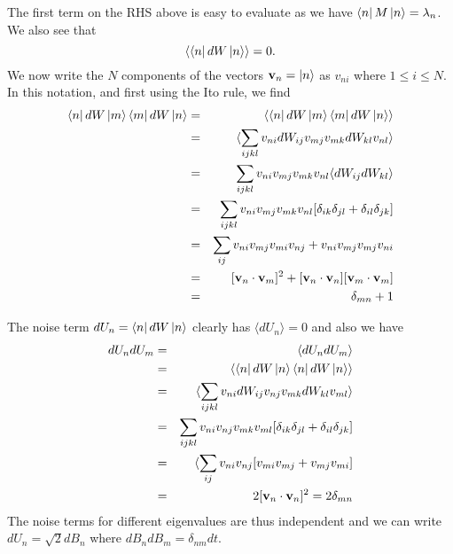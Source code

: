 \documentclass[11pt]{report}
\begin{document}
The first term on the RHS above is easy to evaluate as we have $\bra{n}M\ket{n}= \lambda_n$. We also see that
\begin{equation}
\langle \bra{n}dW\ket{n}\rangle=0.
\end{equation}
We now write the $N$ components of the vectors ${\bf v}_n=\ket{n}$ as $v_{ni}$ where $1\leq i\leq N$. In this notation, and first using the Ito rule, we find 
\begin{eqnarray}
\bra{n} dW\ket{m}\bra{m} dW\ket{n}&=&\langle \bra{n} dW\ket{m}\bra{m} dW\ket{n}\rangle \\
&=& \langle \sum_{ijkl} v_{ni}dW_{ij} v_{mj}v_{mk} dW_{kl}v_{nl}\rangle \\
&=&\sum_{ijkl} v_{ni} v_{mj}v_{mk} v_{nl}\langle dW_{ij}dW_{kl}\rangle\\
&=& \sum_{ijkl} v_{ni} v_{mj}v_{mk} v_{nl}[\delta_{ik}\delta_{jl}+\delta_{il}\delta_{jk}] \\
&=& \sum_{ij}v_{ni} v_{mj}v_{mi} v_{nj} + v_{ni} v_{mj}v_{mj} v_{ni}\\
&=& [{\bf v}_n\cdot {\bf v}_m]^2 + [{\bf v}_n \cdot {\bf v}_n][{\bf v}_m \cdot {\bf v}_m]\\
&=& \delta_{mn} + 1
\end{eqnarray}

The noise term $dU_n = \bra{n} dW\ket{n}$ clearly has $\langle dU_n\rangle =0$ and also we have
\begin{eqnarray}
dU_ndU_m &=& \langle dU_n dU_m\rangle \\
&=& \langle \bra{n} dW\ket{n}\bra{n} dW\ket{n}\rangle \\
&=& \langle \sum_{ijkl} v_{ni}dW_{ij} v_{nj}v_{mk} dW_{kl}v_{ml}\rangle\\
&=&  \sum_{ijkl} v_{ni}v_{nj}v_{mk} v_{ml}[\delta_{ik}\delta_{jl}+\delta_{il}\delta_{jk}]\\
&=&\langle \sum_{ij}v_{ni}v_{nj}[v_{mi} v_{mj}+v_{mj} v_{mi}]\\
&=& 2 [{\bf v}_n \cdot{\bf v}_n]^2 = 2 \delta_{mn}
\end{eqnarray}
The noise terms for different eigenvalues are thus independent and we can write $dU_n =\sqrt{2}dB_n$ where $dB_n dB_m = \delta_{nm}dt$. 
\end{document}
